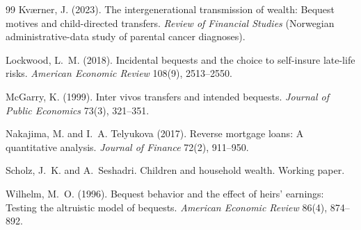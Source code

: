 \documentclass[10pt]{article}
\begin{document}
\begin{thebibliography}{99}
Kv\ae rner, J. (2023).
The intergenerational transmission of wealth: Bequest motives and
child-directed transfers.
\emph{Review of Financial Studies} (Norwegian administrative-data study of
parental cancer diagnoses).

Lockwood, L.~M. (2018).
Incidental bequests and the choice to self-insure late-life risks.
\emph{American Economic Review} 108(9), 2513--2550.

McGarry, K. (1999).
Inter vivos transfers and intended bequests.
\emph{Journal of Public Economics} 73(3), 321--351.

Nakajima, M. and I.~A. Telyukova (2017).
Reverse mortgage loans: A quantitative analysis.
\emph{Journal of Finance} 72(2), 911--950.

Scholz, J.~K. and A.~Seshadri.
Children and household wealth. Working paper.

Wilhelm, M.~O. (1996).
Bequest behavior and the effect of heirs' earnings: Testing the altruistic
model of bequests.
\emph{American Economic Review} 86(4), 874--892.

\end{thebibliography}
\endgroup
\end{document}
